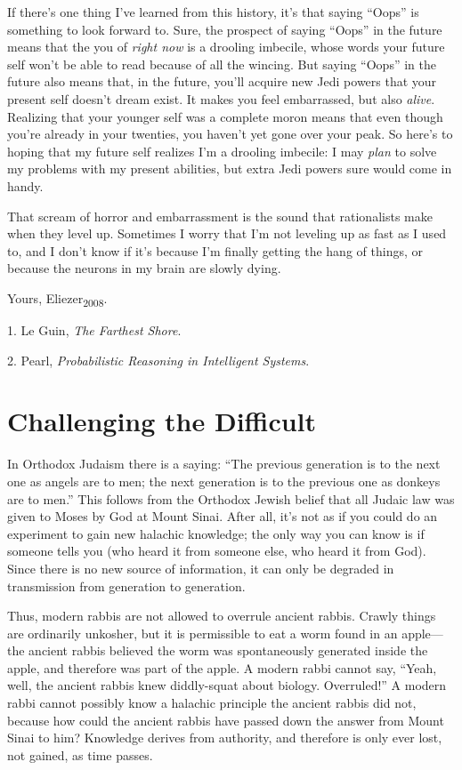 {
 If there's one thing I've learned
from this history, it's that saying
``Oops'' is something to look
forward to. Sure, the prospect of saying
``Oops'' in the future means that
the you of \textit{right now} is a drooling imbecile, whose words your
future self won't be able to read because of all the
wincing. But saying ``Oops'' in the
future also means that, in the future, you'll acquire
new Jedi powers that your present self doesn't dream
exist. It makes you feel embarrassed, but also \textit{alive}.
Realizing that your younger self was a complete moron means that even
though you're already in your twenties, you
haven't yet gone over your peak. So
here's to hoping that my future self realizes
I'm a drooling imbecile: I may \textit{plan} to solve
my problems with my present abilities, but extra Jedi powers sure would
come in handy.}

{
 That scream of horror and embarrassment is the sound that
rationalists make when they level up. Sometimes I worry that
I'm not leveling up as fast as I used to, and I
don't know if it's because
I'm finally getting the hang of things, or because the
neurons in my brain are slowly dying.}

{
 Yours, Eliezer\textsubscript{2008}.}

\myendsectiontext


\bigskip

{
 1. Le Guin, \textit{The Farthest Shore}.}

{
 2. Pearl, \textit{Probabilistic Reasoning in Intelligent
Systems}.}

\chapter{Challenging the Difficult}


{
 In Orthodox Judaism there is a saying: ``The
previous generation is to the next one as angels are to men; the next
generation is to the previous one as donkeys are to
men.'' This follows from the Orthodox Jewish belief
that all Judaic law was given to Moses by God at Mount Sinai. After
all, it's not as if you could do an experiment to gain
new halachic knowledge; the only way you can know is if someone tells
you (who heard it from someone else, who heard it from God). Since
there is no new source of information, it can only be degraded in
transmission from generation to generation. }

{
 Thus, modern rabbis are not allowed to overrule ancient rabbis.
Crawly things are ordinarily unkosher, but it is permissible to eat a
worm found in an apple---the ancient rabbis believed the worm was
spontaneously generated inside the apple, and therefore was part of the
apple. A modern rabbi cannot say, ``Yeah, well, the
ancient rabbis knew diddly-squat about biology.
Overruled!'' A modern rabbi cannot possibly know a
halachic principle the ancient rabbis did not, because how could the
ancient rabbis have passed down the answer from Mount Sinai to him?
Knowledge derives from authority, and therefore is only ever lost, not
gained, as time passes.}


